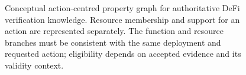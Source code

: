 \documentclass[a4paper]{article}
\begin{document}
\begin{figure}[htbp]
\centering

\caption{Conceptual action-centred property graph for authoritative DeFi
verification knowledge. Resource membership and support for an action are
represented separately. The function and resource branches must be consistent
with the same deployment and requested action; eligibility depends on accepted
evidence and its validity context.}
\end{figure}
\end{document}
